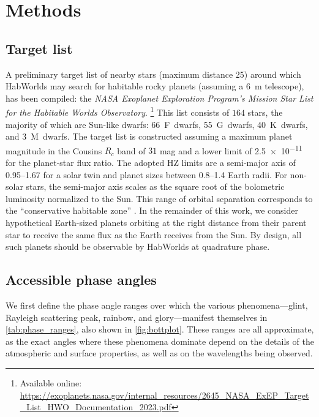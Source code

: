 \documentclass[usenatbib]{mnras}
\newcommand{\HWO}{HabWorlds\xspace}
\begin{document}
\section{Methods}

\subsection{Target list}
\label{subsec:2.1}

A preliminary target list of nearby stars (maximum distance \qty{25}{\parsec}) around which \HWO may search for habitable rocky planets (assuming a \qty{6}{\meter} telescope), has been compiled: the \emph{NASA Exoplanet Exploration Program's Mission Star List for the Habitable Worlds Observatory}.%
\footnote{Available online: \url{https://exoplanets.nasa.gov/internal_resources/2645_NASA_ExEP_Target_List_HWO_Documentation_2023.pdf}}
%
This list consists of $\num{164}$ stars, the majority of which are Sun-like dwarfs: 66~F~dwarfs, 55~G~dwarfs, 40~K~dwarfs, and 3~M~dwarfs.
%
The target list is constructed assuming a maximum planet magnitude in the Cousins $R_c$ band of $31$ mag and a lower limit of \num{2.5e-11} for the planet-star flux ratio. 
% 
The adopted HZ limits are a semi-major axis of \qtyrange{0.95}{1.67}{\au} for a solar twin and planet sizes between \qtyrange{0.8}{1.4}{} Earth radii. 
%
For non-solar stars, the semi-major axis scales as the square root of the bolometric luminosity normalized to the Sun. 
%
This range of orbital separation corresponds to the \enquote{conservative habitable zone} \citep{kasting93, kopparapu13}. 
%
In the remainder of this work, we consider hypothetical Earth-sized planets orbiting at the right distance from their parent star to receive the same flux as the Earth receives from the Sun.
%
By design, all such planets should be observable by \HWO at quadrature phase. 


\subsection{Accessible phase angles}
\label{subsec:2.2}

We first define the phase angle ranges over which the various phenomena---glint, Rayleigh scattering peak, rainbow, and glory---manifest themselves in \cref{tab:phase_ranges}, also shown in \cref{fig:bottplot}. 
%
These ranges are all approximate, as the exact angles where these phenomena dominate depend on the details of the atmospheric and surface properties, as well as on the wavelengths being observed.
\end{document}
